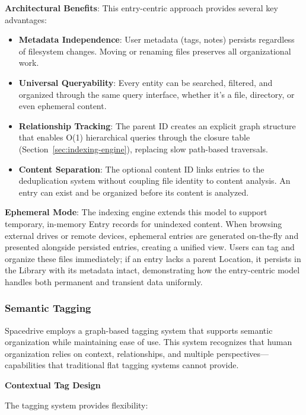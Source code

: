 \documentclass[sigconf]{acmart}
\begin{document}
\textbf{Architectural Benefits}: This entry-centric approach provides several key advantages:

\begin{itemize}[noitemsep, topsep=0pt]
 \item \textbf{Metadata Independence}: User metadata (tags, notes) persists regardless of filesystem changes. Moving or renaming files preserves all organizational work.

 \item \textbf{Universal Queryability}: Every entity can be searched, filtered, and organized through the same query interface, whether it's a file, directory, or even ephemeral content.

 \item \textbf{Relationship Tracking}: The parent ID creates an explicit graph structure that enables O(1) hierarchical queries through the closure table (Section~\ref{sec:indexing-engine}), replacing slow path-based traversals.

 \item \textbf{Content Separation}: The optional content ID links entries to the deduplication system without coupling file identity to content analysis. An entry can exist and be organized before its content is analyzed.
\end{itemize}

\textbf{Ephemeral Mode}: The indexing engine extends this model to support temporary, in-memory Entry records for unindexed content. When browsing external drives or remote devices, ephemeral entries are generated on-the-fly and presented alongside persisted entries, creating a unified view. Users can tag and organize these files immediately; if an entry lacks a parent Location, it persists in the Library with its metadata intact, demonstrating how the entry-centric model handles both permanent and transient data uniformly.

\subsubsection{Semantic Tagging}
Spacedrive employs a graph-based tagging system that supports semantic organization while maintaining ease of use. This system recognizes that human organization relies on context, relationships, and multiple perspectives---capabilities that traditional flat tagging systems cannot provide.

\textbf{Contextual Tag Design}

The tagging system provides flexibility:
\end{document}
